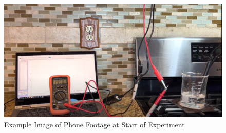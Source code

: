 \begin{figure}[ht]
    \centering
    \includegraphics[width=120mm,height=\textheight,keepaspectratio]{images/setup.png}
    \caption{Example Image of Phone Footage at Start of Experiment}
    \label{fig:footage}
\end{figure}

